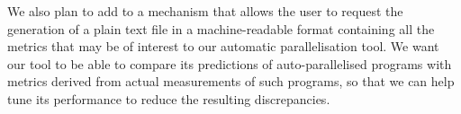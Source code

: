 We also plan to add to \tscope
a mechanism that allows the user to request
the generation of a plain text file in a machine-readable format
containing all the metrics that may be of interest
to our automatic parallelisation tool.
We want our tool to be able to compare
its predictions of auto-parallelised programs
with metrics derived from actual measurements of such programs,
so that we can help tune its performance to reduce the resulting discrepancies.

%
%

